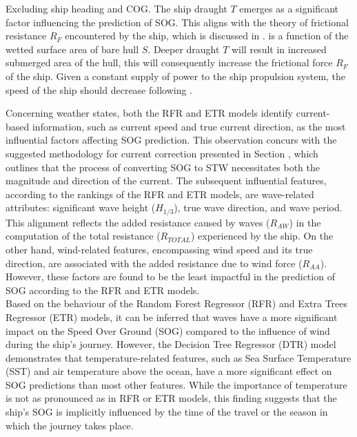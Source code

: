 

Excluding ship heading and COG. The ship draught $T$ emerges as a significant factor influencing the prediction of SOG. This aligns with the theory of frictional resistance $R_F$ encountered by the ship, which is discussed in .  is a function of the wetted surface area of bare hull $S$. Deeper draught $T$ will result in increased submerged area of the hull, this will consequently increase the frictional force $R_F$ of the ship. Given a constant supply of power to the ship propulsion system, the speed of the ship should decrease following .\\

\pagebreak

Concerning weather states, both the RFR and ETR models identify current-based information, such as current speed and true current direction, as the most influential factors affecting SOG prediction. This observation concurs with the suggested methodology for current correction presented in Section , which outlines that the process of converting SOG to STW necessitates both the magnitude and direction of the current. The subsequent influential features, according to the rankings of the RFR and ETR models, are wave-related attributes: significant wave height ($H_{1/3}$), true wave direction, and wave period. This alignment reflects the added resistance caused by waves ($R_{AW}$) in the computation of the total resistance ($R_{TOTAL}$) experienced by the ship. On the other hand, wind-related features, encompassing wind speed and its true direction, are associated with the added resistance due to wind force ($R_{AA}$). However, these factors are found to be the least impactful in the prediction of SOG according to the RFR and ETR models.\\

Based on the behaviour of the Random Forest Regressor (RFR) and Extra Trees Regressor (ETR) models, it can be inferred that waves have a more significant impact on the Speed Over Ground (SOG) compared to the influence of wind during the ship's journey. However, the Decision Tree Regressor (DTR) model demonstrates that temperature-related features, such as Sea Surface Temperature (SST) and air temperature above the ocean, have a more significant effect on SOG predictions than most other features. While the importance of temperature is not as pronounced as in RFR or ETR models, this finding suggests that the ship's SOG is implicitly influenced by the time of the travel or the season in which the journey takes place.\\

